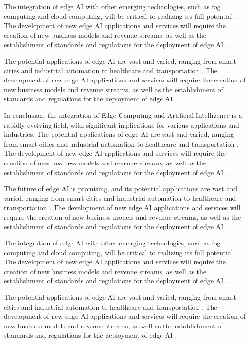 \documentclass[11pt,a4paper]{article}
\begin{document}
The integration of edge AI with other emerging technologies, such as fog computing and cloud computing, will be critical to realizing its full potential \cite{arxiv:2111.10076}. The development of new edge AI applications and services will require the creation of new business models and revenue streams, as well as the establishment of standards and regulations for the deployment of edge AI \cite{arxiv:2106.10063}. 

The potential applications of edge AI are vast and varied, ranging from smart cities and industrial automation to healthcare and transportation \cite{arxiv:2101.10417}. The development of new edge AI applications and services will require the creation of new business models and revenue streams, as well as the establishment of standards and regulations for the deployment of edge AI \cite{arxiv:2105.03559}. 

In conclusion, the integration of Edge Computing and Artificial Intelligence is a rapidly evolving field, with significant implications for various applications and industries. The potential applications of edge AI are vast and varied, ranging from smart cities and industrial automation to healthcare and transportation \cite{arxiv:2206.07164}. The development of new edge AI applications and services will require the creation of new business models and revenue streams, as well as the establishment of standards and regulations for the deployment of edge AI \cite{arxiv:2305.01974}. 

The future of edge AI is promising, and its potential applications are vast and varied, ranging from smart cities and industrial automation to healthcare and transportation \cite{arxiv:2301.07803}. The development of new edge AI applications and services will require the creation of new business models and revenue streams, as well as the establishment of standards and regulations for the deployment of edge AI \cite{arxiv:2309.03420}. 

The integration of edge AI with other emerging technologies, such as fog computing and cloud computing, will be critical to realizing its full potential \cite{arxiv:2403.19729}. The development of new edge AI applications and services will require the creation of new business models and revenue streams, as well as the establishment of standards and regulations for the deployment of edge AI \cite{arxiv:2306.17170}. 

The potential applications of edge AI are vast and varied, ranging from smart cities and industrial automation to healthcare and transportation \cite{arxiv:2510.10166}. The development of new edge AI applications and services will require the creation of new business models and revenue streams, as well as the establishment of standards and regulations for the deployment of edge AI \cite{arxiv:2501.14823}. 
\end{document}
